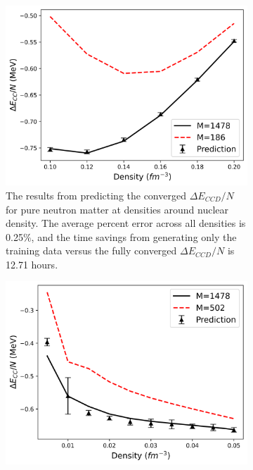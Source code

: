 \begin{figure}
\centering
\begin{subfigure}{.45\linewidth}
  \centering
  \includegraphics[scale=0.5]{Images/Chapter7/ORNL/neutron_matter-4.png}
  \caption{The results from predicting the converged $\Delta E_{CCD}/N$ for pure neutron matter at densities around nuclear density.  The average percent error across all densities is 0.25$\%$, and the time savings from generating only the training data versus the fully converged $\Delta E_{CCD}/N$ is 12.71 hours.}
  \label{fig:pnm_ccd_nuclear}
\end{subfigure}%
\begin{subfigure}{.45\linewidth}
  \centering
  \includegraphics[scale=0.5]{Images/Chapter7/ORNL/neutron_matter_lowdensity-4.png}

\end{subfigure}
\end{figure}
